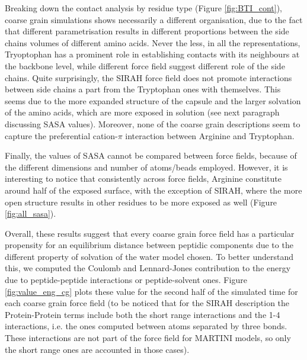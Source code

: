 Breaking down the contact analysis by residue type (Figure \ref{fig:BTI_cont}), coarse grain simulations shows necessarily a different organisation, due to the fact that different parametrisation results in different proportions between the side chains volumes of different amino acids. Never the less, in all the representations, Tryoptophan has a prominent role in establishing contacts with its neighbours at the backbone level, while different force field suggest different role of the side chains. Quite surprisingly, the SIRAH force field does not promote interactions between side chains a part from the Tryptophan ones with themselves. This seems due to the more expanded structure of the capsule and the larger solvation of the amino acids, which are more exposed in solution (see next paragraph discussing SASA values).
%
Moreover, none of the coarse grain descriptions seem to capture the preferential cation-$\pi$ interaction between Arginine and Tryptophan.

Finally, the values of SASA cannot be compared between force fields, because of the different dimensions and number of atoms/beads employed. However, it is interesting to notice that consistently across force fields, Arginine constitute around half of the exposed surface, with the exception of SIRAH, where the more open structure results in other residues to be more exposed as well (Figure \ref{fig:all_sasa}).

Overall, these results suggest that every coarse grain force field has a particular propensity for an equilibrium distance between peptidic components due to the different property of solvation of the water model chosen. To better understand this, we computed the Coulomb and Lennard-Jones contribution to the energy due to peptide-peptide interactions or peptide-solvent ones.
%
Figure \ref{fig:value_eng_cg} plots these value for the second half of the simulated time for each coarse grain force field (to be noticed that for the SIRAH description the Protein-Protein terms include both the short range interactions and the 1-4 interactions, i.e. the ones computed between atoms separated by three bonds. These interactions are not part of the force field for MARTINI models, so only the short range ones are accounted in those cases).

